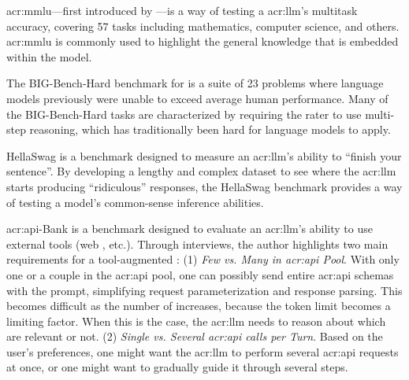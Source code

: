 \gls{acr:mmlu}---first introduced by \cite{hendrycksMeasuringMassiveMultitask2021}---is a way of testing a \acrlong{acr:llm}'s multitask accuracy, covering 57 tasks including mathematics, computer science, and others. \gls{acr:mmlu} is commonly used to highlight the general knowledge that is embedded within the model.

The BIG-Bench-Hard benchmark \citep{suzgunChallengingBIGBenchTasks2022} for  is a suite of 23 problems where language models previously were unable to exceed average human performance. Many of the BIG-Bench-Hard tasks are characterized by requiring the rater to use multi-step reasoning, which has traditionally been hard for language models to apply.

HellaSwag \citep{zellersHellaSwagCanMachine2019} is a benchmark designed to measure an \acrshort{acr:llm}'s ability to \enquote{finish your sentence}. By developing a lengthy and complex dataset to see where the \acrshort{acr:llm} starts producing \enquote{ridiculous} responses, the HellaSwag benchmark provides a way of testing a model's common-sense inference abilities.

\acrshort{acr:api}-Bank \citep{liAPIBankComprehensiveBenchmark2023} is a benchmark designed to evaluate an \acrshort{acr:llm}'s ability to use external tools (web , etc.). Through interviews, the author highlights two main requirements for a tool-augmented  \citep[2]{liAPIBankComprehensiveBenchmark2023}: (1) \textit{Few vs. Many  in \acrshort{acr:api} Pool}. With only one or a couple  in the \acrshort{acr:api} pool, one can possibly send entire \acrshort{acr:api} schemas with the prompt, simplifying request parameterization and response parsing. This becomes difficult as the number of  increases, because the token limit becomes a limiting factor. When this is the case, the \acrshort{acr:llm} needs to reason about which  are relevant or not. (2) \textit{Single vs. Several \acrshort{acr:api} calls per Turn}. Based on the user's preferences, one might want the \acrshort{acr:llm} to perform several \acrshort{acr:api} requests at once, or one might want to gradually guide it through several steps.

\glsresetall